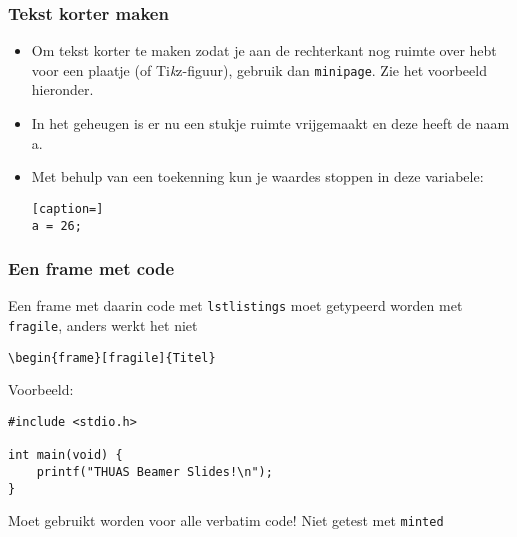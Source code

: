 \documentclass[fleqn,aspectratio=169,dutch,10pt]{beamer}
\begin{document}
\begin{frame}[fragile]
\frametitle{Tekst korter maken}
\begin{itemize}
\item Om tekst korter te maken zodat je aan de rechterkant nog ruimte over hebt voor een plaatje (of Ti\emph{k}z-figuur), gebruik dan \lstinline|minipage|. Zie het voorbeeld hieronder.
\end{itemize}
\bigskip
\begin{minipage}{0.5\linewidth}
\begin{itemize}
\item In het geheugen is er nu een stukje ruimte 
vrijgemaakt en deze heeft de naam a.
\item Met behulp van een toekenning kun je waardes 
stoppen in deze variabele:
\begin{lstlisting}[caption=]
a = 26;
\end{lstlisting}
\end{itemize}
\end{minipage}\hfil%
\begin{minipage}{0.2\linewidth}
\end{minipage}
\end{frame}


\begin{frame}[fragile]
\frametitle{Een frame met code}
Een frame met daarin code met \texttt{lstlistings} moet getypeerd worden met \texttt{fragile}, anders werkt het niet

\begin{lstlisting}
\begin{frame}[fragile]{Titel}
\end{lstlisting}

Voorbeeld:

\begin{lstlisting}
#include <stdio.h>

int main(void) {
    printf("THUAS Beamer Slides!\n");
}
\end{lstlisting}

Moet gebruikt worden voor alle verbatim code! Niet getest met \lstinline|minted|
\end{frame}
\end{document}
